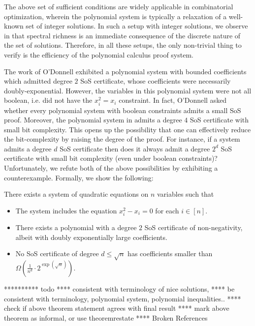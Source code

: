 The above set of sufficient conditions are widely applicable in combinatorial optimization, wherein the polynomial system is typically a relaxation of a well-known set of integer solutions.  
%
In such a setup with integer solutions, we observe in  that spectral richness is an immediate consequence of the discrete nature of the set of solutions.
%
Therefore, in all these setups, the only non-trivial thing to verify is the efficiency of the polynomial calculus proof system.
%


The work of O'Donnell \cite{odonnell17} exhibited a polynomial system with bounded coefficients which admitted degree $2$ SoS certificate, whose coefficients were necessarily doubly-exponential.
%
However, the variables in this polynomial system were not all boolean, i.e. did not have the $x_i^2 = x_i$ constraint.
%
In fact, O'Donnell asked whether every polynomial system with boolean constraints admits a small SoS proof.
%
Moreover, the polynomial system in \cite{odonnell17} admits a degree $4$ SoS certificate with small bit complexity.  
%
This opens up the possibility that one can effectively reduce the bit-complexity by raising the degree of the proof.
%
For instance, if a system admits a degree $d$ SoS certificate then does it always admit a degree $2^d$ SoS certificate with small bit complexity (even under boolean constraints)?
Unfortunately, we refute both of the above possibilities by exhibiting a counterexample.
%
Formally, we show the following:

\begin{theorem}\label{thm:counter}
	There exists a system of quadratic equations on $n$ variables such that
	\begin{itemize}
	\item The system includes the equation $x_i^2 - x_i = 0$ for each $i \in [n]$.
	\item There exists a polynomial with a degree $2$ SoS certificate of non-negativity, albeit with doubly exponentially large coefficients.
	\item No SoS certificate of degree $d \leq \sqrt{n}$ has coefficients smaller than $\Omega\left(\frac{1}{n^d}\cdot 2^{\exp(\sqrt{n})}\right)$.
	\end{itemize}	
\end{theorem}

********** todo
**** consistent with terminology of nice solutions, 
**** be consistent with terminology, polynomial system, polynomial inequalities..
**** check if above theorem statement agrees with final result
**** mark above theorem as informal, or use theoremrestate 
**** Broken References



